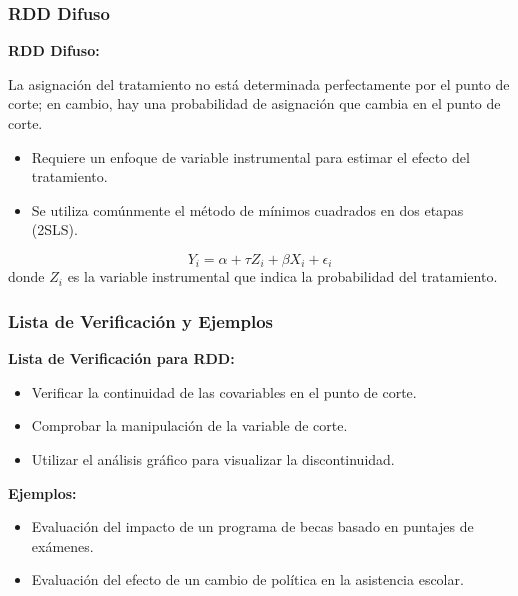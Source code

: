 \documentclass[notes,10pt,aspectratio=169]{beamer}
\begin{document}
\begin{frame}
  \frametitle{RDD Difuso}

  \textbf{RDD Difuso:} 
  
  La asignación del tratamiento no está determinada perfectamente por el punto de corte; en cambio, hay una probabilidad de asignación que cambia en el punto de corte.

  \vspace{1em}
  \begin{itemize}
    \item Requiere un enfoque de variable instrumental para estimar el efecto del tratamiento.
    \item Se utiliza comúnmente el método de mínimos cuadrados en dos etapas (2SLS).
  \end{itemize}
  \begin{equation}
    Y_i = \alpha + \tau Z_i + \beta X_i + \epsilon_i
  \end{equation}
  donde $Z_i$ es la variable instrumental que indica la probabilidad del tratamiento.
\end{frame}

\begin{frame}
  \frametitle{Lista de Verificación y Ejemplos}

  \textbf{Lista de Verificación para RDD:}
  \begin{itemize}
    \item Verificar la continuidad de las covariables en el punto de corte.
    \item Comprobar la manipulación de la variable de corte.
    \item Utilizar el análisis gráfico para visualizar la discontinuidad.
  \end{itemize}

  \vspace{1em}
  \textbf{Ejemplos:}
  \begin{itemize}
    \item Evaluación del impacto de un programa de becas basado en puntajes de exámenes.
    \item Evaluación del efecto de un cambio de política en la asistencia escolar.
  \end{itemize}
\end{frame}
\end{document}
